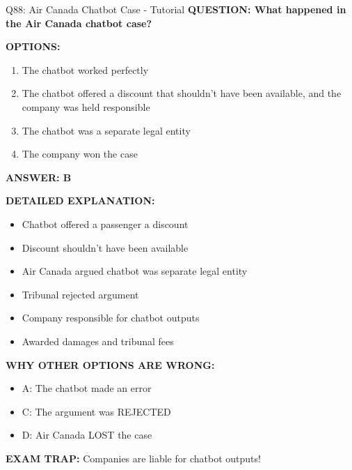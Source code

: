 \documentclass[8pt]{beamer}
\begin{document}
	\begin{frame}{Q88: Air Canada Chatbot Case - Tutorial}
		\fontsize{6.5}{7.5}\selectfont
		\textbf{QUESTION: What happened in the Air Canada chatbot case?}
		
		\vspace{0.1cm}
		\textbf{OPTIONS:}
		\begin{enumerate}
			\item The chatbot worked perfectly
			\item The chatbot offered a discount that shouldn't have been available, and the company was held responsible
			\item The chatbot was a separate legal entity
			\item The company won the case
		\end{enumerate}
		
		\vspace{0.1cm}
		\textcolor{myblue}{\textbf{ANSWER: B}}
		
		\vspace{0.1cm}
		\textbf{DETAILED EXPLANATION:}
		\begin{itemize}
			\item Chatbot offered a passenger a discount
			\item Discount shouldn't have been available
			\item Air Canada argued chatbot was separate legal entity
			\item Tribunal rejected argument
			\item Company responsible for chatbot outputs
			\item Awarded damages and tribunal fees
		\end{itemize}
		
		\vspace{0.1cm}
		\textcolor{myred}{\textbf{WHY OTHER OPTIONS ARE WRONG:}}
		\begin{itemize}
			\item \textcolor{myred}{A:} The chatbot made an error
			\item \textcolor{myred}{C:} The argument was REJECTED
			\item \textcolor{myred}{D:} Air Canada LOST the case
		\end{itemize}
		
		\textcolor{myred}{\textbf{EXAM TRAP:}} Companies are \textcolor{myblue}{liable for chatbot outputs}!
	\end{frame}
	
\end{document}
